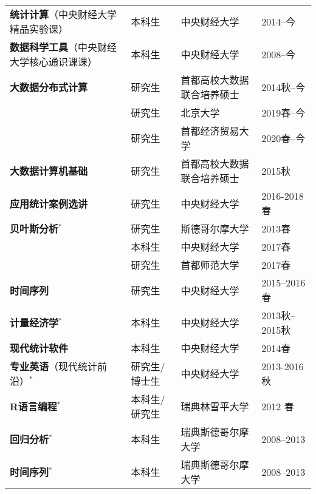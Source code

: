 \documentclass[twoside,a4paper,10pt]{amsart}
\begin{document}
\begin{tabular}{l l ll}
  \textbf{统计计算}（中央财经大学精品实验课）       & 本科生        & 中央财经大学               & 2014--今       \\
  \textbf{数据科学工具}（中央财经大学核心通识课课） & 本科生        & 中央财经大学               & 2008--今       \\
  \textbf{大数据分布式计算}                         & 研究生        & 首都高校大数据联合培养硕士 & 2014秋--今     \\
                                                    & 研究生        & 北京大学                   & 2019春--今     \\
                                                    & 研究生        & 首都经济贸易大学           & 2020春--今     \\
  \textbf{大数据计算机基础}                         & 研究生        & 首都高校大数据联合培养硕士 & 2015秋         \\
  \textbf{应用统计案例选讲}                         & 研究生        & 中央财经大学               & 2016-2018春    \\
  \textbf{贝叶斯分析}$^*$                           & 研究生        & 斯德哥尔摩大学             & 2013春         \\
                                                    & 本科生        & 中央财经大学               & 2017春         \\
                                                    & 研究生        & 首都师范大学               & 2017春         \\
  \textbf{时间序列}                                 & 研究生        & 中央财经大学               & 2015--2016春   \\
  \textbf{计量经济学}$^*$                           & 本科生        & 中央财经大学               & 2013秋--2015秋 \\
  \textbf{现代统计软件}                             & 本科生        & 中央财经大学               & 2014春         \\
  \textbf{专业英语}（现代统计前沿）$^*$             & 研究生/博士生 & 中央财经大学               & 2013-2016秋    \\

  \textbf{R语言编程}$^*$&本科生/研究生&瑞典林雪平大学&  2012 春\\
  \textbf{回归分析}$^*$&本科生&瑞典斯德哥尔摩大学&2008--2013\\
  \textbf{时间序列}$^*$&本科生&瑞典斯德哥尔摩大学&2008--2013\\
\end{tabular}
\end{document}

